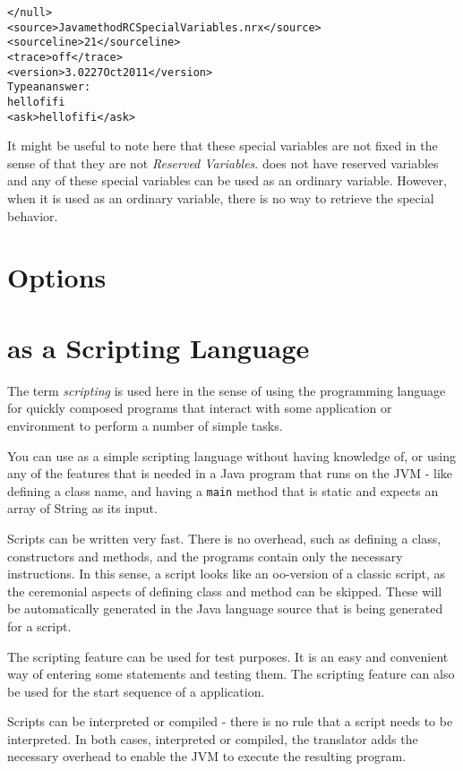 {\begin{alltt}
</null>
<source>Java method RCSpecialVariables.nrx</source>
<sourceline>21</sourceline>
<trace>off</trace>
<version>\nr{} 3.02 27 Oct 2011</version>
Type an answer:
hello fifi
<ask>hello fifi</ask>
\end{alltt}
It might be useful to note here that these special variables are not
fixed in the sense of that they are not \emph{Reserved Variables}. \nr{}
does not have reserved variables and any of these special variables
can be used as an ordinary variable. However, when it is used as an
ordinary variable, there is no way to retrieve the special behavior.

\chapter{\nr{} Options}


\chapter{\nr{} as a Scripting Language}
The term \emph{scripting} is used here in the sense of using the
programming language for quickly composed programs that interact with
some application or environment to perform a number of simple tasks.

You can use \nr{} as a simple scripting language without having
knowledge of, or using any of the features that is needed in a Java
program that runs on the JVM - like defining a class name, and having
a \texttt{main} method that is static and expects an array of String
as its input. 

Scripts can be written very fast. There is
no overhead, such as defining a class, constructors and methods, and the programs contain only
the necessary instructions. In this sense, a \nr{} script looks like
an oo-version of a classic script, as the ceremonial aspects of defining
class and method can be skipped. These will be automatically generated
in the Java language source that is being generated for a script.

The scripting feature can be used for test purposes. It is an easy and convenient way of entering some statements and testing them.
The scripting feature can also be used for the start sequence of a \nr{} application.

Scripts can be interpreted or compiled - there is no rule that a
script needs to be interpreted. In both cases, interpreted or
compiled, the \nr{} translator adds the necessary overhead to enable
the JVM to execute the resulting program.

}

